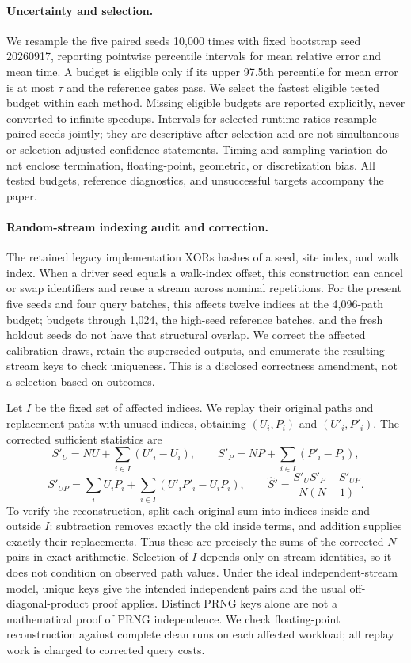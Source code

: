 \paragraph{Uncertainty and selection.}
We resample the five paired seeds 10,000 times with fixed bootstrap seed
20260917, reporting pointwise percentile intervals for mean relative error
and mean time. A budget is eligible only if its upper 97.5th percentile
for mean error is at most $\tau$ and the reference gates pass. We select the
fastest eligible tested budget within each method. Missing eligible budgets
are reported explicitly, never converted to infinite speedups. Intervals
for selected runtime ratios resample paired seeds jointly; they are
descriptive after selection and are not simultaneous or selection-adjusted
confidence statements. Timing and sampling variation do not enclose
termination, floating-point, geometric, or discretization bias. All tested
budgets, reference diagnostics, and unsuccessful targets accompany the paper.



\paragraph{Random-stream indexing audit and correction.}
The retained legacy implementation XORs hashes of a seed, site index, and
walk index. When a driver seed equals a walk-index offset, this construction
can cancel or swap identifiers and reuse a stream across nominal repetitions.
For the present five seeds and four query batches, this affects twelve
indices at the 4,096-path budget; budgets through 1,024, the high-seed
reference batches, and the fresh holdout seeds do not have that structural
overlap. We correct the affected calibration draws, retain the superseded
outputs, and enumerate the resulting stream keys to check uniqueness.
This is a disclosed correctness amendment, not a selection based on outcomes.

Let $I$ be the fixed set of affected indices. We replay their original
paths and replacement paths with unused indices, obtaining $(U_i,P_i)$ and
$(U'_i,P'_i)$. The corrected sufficient statistics are
\[
 S'_U=N\bar U+\sum_{i\in I}(U'_i-U_i),\qquad
 S'_P=N\bar P+\sum_{i\in I}(P'_i-P_i),
\]
\[
 S'_{UP}=\sum_i U_iP_i+
       \sum_{i\in I}(U'_iP'_i-U_iP_i),\qquad
 \widehat S'=\frac{S'_US'_P-S'_{UP}}{N(N-1)}.
\]
To verify the reconstruction, split each original sum into indices inside
and outside $I$: subtraction removes exactly the old inside terms, and
addition supplies exactly their replacements. Thus these are precisely the
sums of the corrected $N$ pairs in exact arithmetic. Selection of $I$ depends
only on stream identities, so it does not condition on observed path values.
Under the ideal independent-stream model, unique keys give the intended
independent pairs and the usual off-diagonal-product proof applies. Distinct
PRNG keys alone are not a mathematical proof of PRNG independence.
We check floating-point reconstruction against complete clean runs on each
affected workload; all replay work is charged to corrected query costs.

